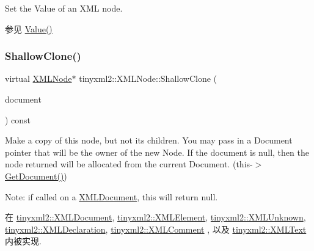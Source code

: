 Set the Value of an X\+ML node. \begin{DoxySeeAlso}{参见}
\hyperlink{classtinyxml2_1_1_x_m_l_node_a0485e51c670e741884cfd8362274d680}{Value()} 
\end{DoxySeeAlso}
\mbox{\label{classtinyxml2_1_1_x_m_l_node_a8402cbd3129d20e9e6024bbcc0531283}} 
\subsubsection{\texorpdfstring{Shallow\+Clone()}{ShallowClone()}}
{\footnotesize\ttfamily virtual \hyperlink{classtinyxml2_1_1_x_m_l_node}{X\+M\+L\+Node}$\ast$ tinyxml2\+::\+X\+M\+L\+Node\+::\+Shallow\+Clone (\begin{DoxyParamCaption}\item[{\hyperlink{classtinyxml2_1_1_x_m_l_document}{X\+M\+L\+Document} $\ast$}]{document }\end{DoxyParamCaption}) const\hspace{0.3cm}{\ttfamily [pure virtual]}}

Make a copy of this node, but not its children. You may pass in a Document pointer that will be the owner of the new Node. If the \textquotesingle{}document\textquotesingle{} is null, then the node returned will be allocated from the current Document. (this-\/$>$\hyperlink{classtinyxml2_1_1_x_m_l_node_af343d1ef0b45c0020e62d784d7e67a68}{Get\+Document()})

Note\+: if called on a \hyperlink{classtinyxml2_1_1_x_m_l_document}{X\+M\+L\+Document}, this will return null. 

在 \hyperlink{classtinyxml2_1_1_x_m_l_document_aa37cc1709d7e1e988bc17dcfb24a69b8}{tinyxml2\+::\+X\+M\+L\+Document}, \hyperlink{classtinyxml2_1_1_x_m_l_element_aafa2807a45b28fe096b29d76e6a13b7c}{tinyxml2\+::\+X\+M\+L\+Element}, \hyperlink{classtinyxml2_1_1_x_m_l_unknown_ab73b48b819aa4b2ef3815dc2d7d20d5f}{tinyxml2\+::\+X\+M\+L\+Unknown}, \hyperlink{classtinyxml2_1_1_x_m_l_declaration_ad9d60e6d2df75c13eb6bf7319985b747}{tinyxml2\+::\+X\+M\+L\+Declaration}, \hyperlink{classtinyxml2_1_1_x_m_l_comment_adf5b5c0319351dcc339df098d11e8fb2}{tinyxml2\+::\+X\+M\+L\+Comment} , 以及 \hyperlink{classtinyxml2_1_1_x_m_l_text_a86d265c93152726c8c6831e9594840e6}{tinyxml2\+::\+X\+M\+L\+Text} 内被实现.

